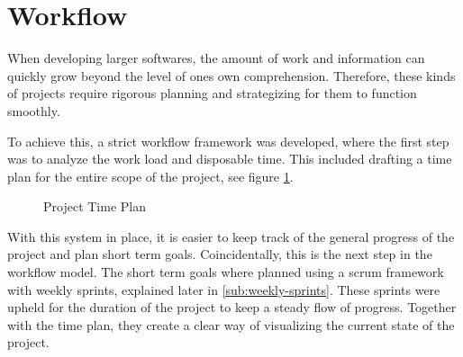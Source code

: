 \section{Workflow}
    When developing larger softwares, the amount of work and information can quickly grow beyond the level of ones own comprehension. Therefore, these kinds of projects require rigorous planning and strategizing for them to function smoothly.

    To achieve this, a strict workflow framework was developed, where the first step was to analyze the work load and disposable time. This included drafting a time plan for the entire scope of the project, see figure \ref{fig:time-plan}. 

    \begin{figure}[ht]
        \centering
        \caption{Project Time Plan}
        \label{fig:time-plan}
    \end{figure}

    With this system in place, it is easier to keep track of the general progress of the project and plan short term goals. Coincidentally, this is the next step in the workflow model. The short term goals where planned using a scrum framework with weekly sprints, explained later in \ref{sub:weekly-sprints}. These sprints were upheld for the duration of the project to keep a steady flow of progress. Together with the time plan, they create a clear way of visualizing the current state of the project.

